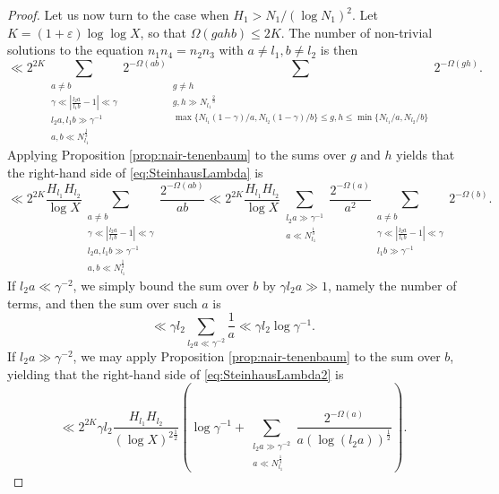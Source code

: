 \documentclass[11pt]{tran-l}
\theoremstyle{definition}
\theoremstyle{remark}
\numberwithin{equation}{section}
\begin{document}
\begin{proof}
Let us now turn to the case when $H_1>N_1/(\log N_1)^2$. Let $K=(1+\varepsilon)\log\log X$, so that $\Omega(gahb)\leq 2K$. The number of non-trivial solutions to the equation $n_1n_4=n_2n_3$ with $a\neq l_1, b\neq l_2$ is then 
\begin{equation}\label{eq:SteinhausLambda}\ll2^{2K}\sum_{\substack{a\neq b \\  \gamma \ll \left\lvert\frac{l_2a}{l_1b}-1\right\rvert \ll \gamma \\ l_2a, l_1b \gg\gamma^{-1}\\ a, b\ll N_{l_1}^{\frac{1}{3}}}} 2^{-\Omega(ab)}\sum_{\substack{g\neq h \\ g, h\gg {N_{l_1}}^{\frac{2}{3}} \\ \max\{N_{l_1}(1-\gamma)/a, N_{l_2}(1-\gamma)/b\}\leq g, h\leq \min\{N_{l_1}/a, N_{l_2}/b \}}}2^{-\Omega(gh)}.
\end{equation}
Applying Proposition \ref{prop:nair-tenenbaum} to the sums over $g$ and $h$ yields that the right-hand side of \eqref{eq:SteinhausLambda} is
\begin{equation}
\label{eq:SteinhausLambda2}
 \ll 2^{2K} \frac{H_{l_1}H_{l_2}}{\log X}\sum_{\substack{a\neq b \\  \gamma \ll \left\lvert\frac{l_2a}{l_1b}-1\right\rvert \ll \gamma \\ l_2a, l_1b \gg\gamma^{-1}\\ a, b\ll N_{l_1}^{\frac{1}{3}}}} \frac{2^{-\Omega(ab)}}{ab}  \ll 2^{2K} \frac{H_{l_1}H_{l_2}}{\log X}\sum_{\substack{l_2a \gg\gamma^{-1}\\ a\ll N_{l_1}^{\frac{1}{3}}}} \frac{2^{-\Omega(a)}}{a^2} \sum_{\substack{a\neq b \\  \gamma \ll \left\lvert\frac{l_2a}{l_1b}-1\right\rvert \ll \gamma \\ l_1b \gg\gamma^{-1} }} 2^{-\Omega(b)}.
\end{equation}
If $l_2a\ll \gamma^{-2}$, we simply bound the sum over $b$ by $\gamma l_2a\gg 1$, namely the number of terms, and then the sum over such $a$ is 
\begin{equation*}
    \ll\gamma l_2 \sum_{l_2a\ll \gamma^{-2}}\frac{1}{a} \ll \gamma l_2 \log \gamma^{-1}.
\end{equation*}
If $l_2a\gg \gamma^{-2}$, we may apply Proposition \ref{prop:nair-tenenbaum} to the sum over $b$, yielding that the right-hand side of    \eqref{eq:SteinhausLambda2} is
\begin{equation}\label{eq:SteinhausLambda3}
  \ll 2^{2K} \gamma l_2\frac{H_{l_1}H_{l_2}}{(\log X)^{2\frac{1}{2}}} \left(\log\gamma^{-1} + \sum_{\substack{l_2a\gg \gamma^{-2} \\ a\ll N_{l_1}^{\frac{1}{3}}}} \frac{2^{-\Omega(a)}}{a(\log (l_2a))^{\frac{1}{2}}} \right).

\end{equation}
\end{proof}
\end{document}
